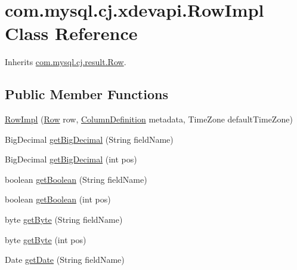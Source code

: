 \hypertarget{classcom_1_1mysql_1_1cj_1_1xdevapi_1_1_row_impl}{}\section{com.\+mysql.\+cj.\+xdevapi.\+Row\+Impl Class Reference}
\label{classcom_1_1mysql_1_1cj_1_1xdevapi_1_1_row_impl}


Inherits \mbox{\hyperlink{interfacecom_1_1mysql_1_1cj_1_1result_1_1_row}{com.\+mysql.\+cj.\+result.\+Row}}.

\subsection*{Public Member Functions}
\begin{DoxyCompactItemize}
\item 
\mbox{\hyperlink{classcom_1_1mysql_1_1cj_1_1xdevapi_1_1_row_impl_af687747767168ead978243dd23987353}{Row\+Impl}} (\mbox{\hyperlink{interfacecom_1_1mysql_1_1cj_1_1result_1_1_row}{Row}} row, \mbox{\hyperlink{interfacecom_1_1mysql_1_1cj_1_1protocol_1_1_column_definition}{Column\+Definition}} metadata, Time\+Zone default\+Time\+Zone)
\item 
Big\+Decimal \mbox{\hyperlink{classcom_1_1mysql_1_1cj_1_1xdevapi_1_1_row_impl_ada7aa558c2ae857cf3f7b62dbc3b9fd0}{get\+Big\+Decimal}} (String field\+Name)
\item 
Big\+Decimal \mbox{\hyperlink{classcom_1_1mysql_1_1cj_1_1xdevapi_1_1_row_impl_a3be4b63b81ed1911bab3bfb4376a4662}{get\+Big\+Decimal}} (int pos)
\item 
boolean \mbox{\hyperlink{classcom_1_1mysql_1_1cj_1_1xdevapi_1_1_row_impl_ab013f9d30898e83321c1b61172af8812}{get\+Boolean}} (String field\+Name)
\item 
boolean \mbox{\hyperlink{classcom_1_1mysql_1_1cj_1_1xdevapi_1_1_row_impl_a415a6a966e27fae2aa8e3ba29ce5bba1}{get\+Boolean}} (int pos)
\item 
byte \mbox{\hyperlink{classcom_1_1mysql_1_1cj_1_1xdevapi_1_1_row_impl_af5e187068279df915587e8efa9b9a556}{get\+Byte}} (String field\+Name)
\item 
byte \mbox{\hyperlink{classcom_1_1mysql_1_1cj_1_1xdevapi_1_1_row_impl_a8c982de3299b207b54236e6f077cced4}{get\+Byte}} (int pos)
\item 
Date \mbox{\hyperlink{classcom_1_1mysql_1_1cj_1_1xdevapi_1_1_row_impl_aba347698272818f6daec7eeec91f98d8}{get\+Date}} (String field\+Name)
\item 

\end{DoxyCompactItemize}
